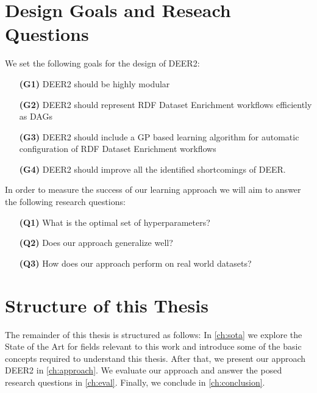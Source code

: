 \section{Design Goals and Reseach Questions}
\label{sec:goals}
We set the following goals for the design of \ac{DEER2}:

\begin{itemize}
  \item[\textbf{(G1)}] \ac{DEER2} should be highly modular
  \item[\textbf{(G2)}] \ac{DEER2} should represent RDF Dataset Enrichment workflows efficiently as \acp{DAG}
  \item[\textbf{(G3)}] \ac{DEER2} should include a \ac{GP} based learning algorithm for automatic configuration of RDF Dataset Enrichment workflows
  \item[\textbf{(G4)}] \ac{DEER2} should improve all the identified shortcomings of \ac{DEER}.
\end{itemize}

\noindent
In order to measure the success of our learning approach we will aim to answer the following research questions:

\begin{itemize}
  \item[\textbf{(Q1)}] What is the optimal set of hyperparameters?
  \item[\textbf{(Q2)}] Does our approach generalize well?
  \item[\textbf{(Q3)}] How does our approach perform on real world datasets?
\end{itemize}

\section{Structure of this Thesis}
\label{sec:structure}
The remainder of this thesis is structured as follows:
In \autoref{ch:sota} we explore the State of the Art for fields relevant to this work and introduce some of the basic concepts required to understand this thesis.
After that, we present our approach \ac{DEER2} in \autoref{ch:approach}.
We evaluate our approach and answer the posed research questions in \autoref{ch:eval}.
Finally, we conclude in \autoref{ch:conclusion}.






